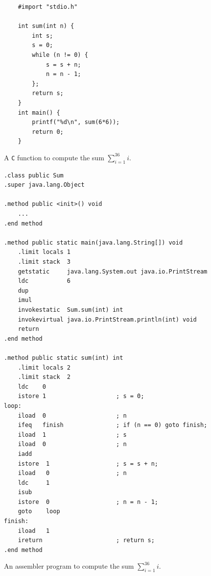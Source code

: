 \begin{figure}[!ht]
  \centering
  \begin{verbatim}
    #import "stdio.h"
    
    int sum(int n) {
        int s;
        s = 0;
        while (n != 0) {
            s = s + n;
            n = n - 1;    
        };
        return s;
    }
    int main() {
        printf("%d\n", sum(6*6));
        return 0;
    }
\end{verbatim}
\vspace*{-0.3cm}
\caption{A \texttt{C} function to compute the sum $\sum\limits_{i=1}^{36} i$.}
\label{fig:sum-jasmin.c}
\end{figure}

\begin{figure}[!ht]
  \centering
\begin{verbatim}
.class public Sum
.super java.lang.Object

.method public <init>() void
    ...
.end method

.method public static main(java.lang.String[]) void
    .limit locals 1
    .limit stack  3
    getstatic     java.lang.System.out java.io.PrintStream
    ldc           6
    dup
    imul
    invokestatic  Sum.sum(int) int
    invokevirtual java.io.PrintStream.println(int) void
    return
.end method

.method public static sum(int) int
    .limit locals 2
    .limit stack  2
    ldc    0
    istore 1                    ; s = 0;
loop:
    iload  0                    ; n
    ifeq   finish               ; if (n == 0) goto finish;
    iload  1                    ; s
    iload  0                    ; n
    iadd
    istore  1                   ; s = s + n;
    iload   0                   ; n
    ldc     1
    isub
    istore  0                   ; n = n - 1;
    goto    loop
finish:
    iload   1
    ireturn                     ; return s;
.end method
\end{verbatim}
\vspace*{-0.3cm}
\caption{An assembler program to compute the sum $\sum\limits_{i=1}^{36} i$.}
\label{fig:Sum.jas}
\end{figure}


